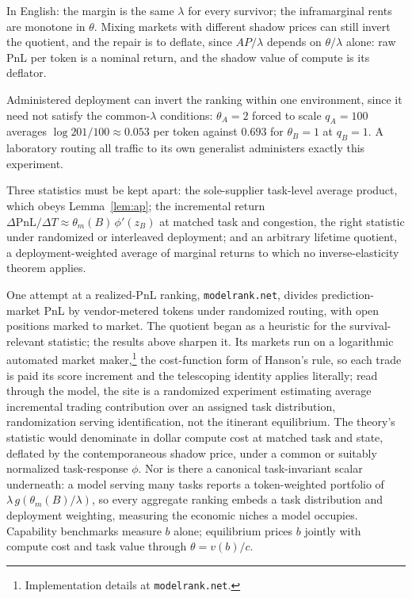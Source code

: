 \documentclass[preprint,11pt,authoryear]{elsarticle}
\newcommand{\PnL}{\mathrm{PnL}}
\begin{document}
In English: the margin is the same $\lambda$ for every survivor; the inframarginal rents are monotone in $\theta$. Mixing markets with different shadow prices can still invert the quotient, and the repair is to deflate, since $AP/\lambda$ depends on $\theta/\lambda$ alone: raw PnL per token is a nominal return, and the shadow value of compute is its deflator.

Administered deployment can invert the ranking within one environment, since it need not satisfy the common-$\lambda$ conditions: $\theta_A = 2$ forced to scale $q_A = 100$ averages $\log 201/100 \approx 0.053$ per token against $0.693$ for $\theta_B = 1$ at $q_B = 1$. A laboratory routing all traffic to its own generalist administers exactly this experiment.

Three statistics must be kept apart: the sole-supplier task-level average product, which obeys Lemma~\ref{lem:ap}; the incremental return $\Delta\PnL/\Delta T \approx \theta_m(B)\,\phi'(z_B)$ at matched task and congestion, the right statistic under randomized or interleaved deployment; and an arbitrary lifetime quotient, a deployment-weighted average of marginal returns to which no inverse-elasticity theorem applies.

One attempt at a realized-PnL ranking, \texttt{modelrank.net}, divides prediction-market PnL by vendor-metered tokens under randomized routing, with open positions marked to market. The quotient began as a heuristic for the survival-relevant statistic; the results above sharpen it. Its markets run on a logarithmic automated market maker,\footnote{Implementation details at \texttt{modelrank.net}.} the cost-function form of Hanson's rule, so each trade is paid its score increment and the telescoping identity applies literally; read through the model, the site is a randomized experiment estimating average incremental trading contribution over an assigned task distribution, randomization serving identification, not the itinerant equilibrium. The theory's statistic would denominate in dollar compute cost at matched task and state, deflated by the contemporaneous shadow price, under a common or suitably normalized task-response $\phi$. Nor is there a canonical task-invariant scalar underneath: a model serving many tasks reports a token-weighted portfolio of $\lambda\, g(\theta_m(B)/\lambda)$, so every aggregate ranking embeds a task distribution and deployment weighting, measuring the economic niches a model occupies. Capability benchmarks measure $b$ alone; equilibrium prices $b$ jointly with compute cost and task value through $\theta = v(b)/c$.
\end{document}
